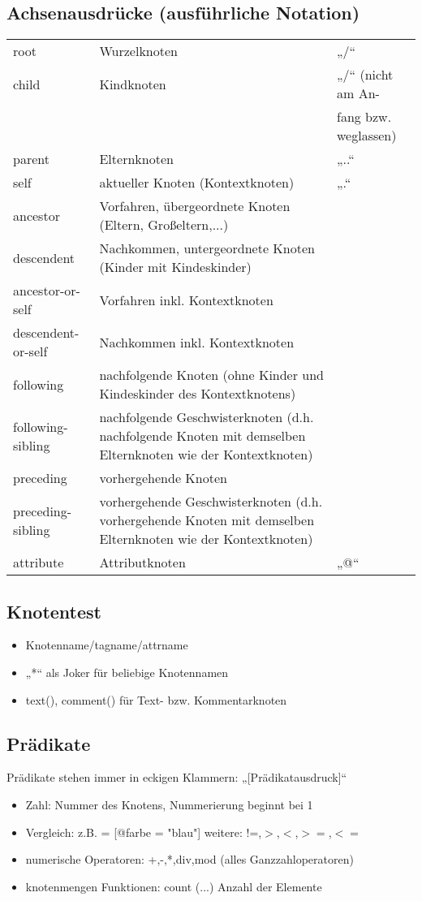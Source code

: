 \subsection{Achsenausdrücke (ausführliche Notation)}
\begin{tabularx}{\textwidth}{lXl}
root & Wurzelknoten & „/“\\
child & Kindknoten & „/“ {\tiny (nicht am An-}\\
 & & {\tiny fang bzw. weglassen)}\\
parent & Elternknoten & „..“\\
self & aktueller Knoten (Kontextknoten) & „.“\\
ancestor & Vorfahren, übergeordnete Knoten (Eltern, Großeltern,...)& \\
descendent & Nachkommen, untergeordnete Knoten (Kinder mit Kindeskinder) & \\
ancestor-or-self & Vorfahren inkl. Kontextknoten & \\
descendent-or-self & Nachkommen inkl. Kontextknoten & \\
following & nachfolgende Knoten (ohne Kinder und Kindeskinder des Kontextknotens) & \\
following-sibling & nachfolgende Geschwisterknoten (d.h. nachfolgende Knoten mit demselben Elternknoten wie der Kontextknoten) & \\
preceding & vorhergehende Knoten & \\
preceding-sibling & vorhergehende Geschwisterknoten (d.h. vorhergehende Knoten mit demselben Elternknoten wie der Kontextknoten) & \\
attribute & Attributknoten & „@“
\end{tabularx}

\subsection{Knotentest}
\begin{itemize}
\item Knotenname/tagname/attrname
\item „*“ als Joker für beliebige Knotennamen
\item text(), comment() für Text- bzw. Kommentarknoten 
\end{itemize}

\subsection{Prädikate}
Prädikate stehen immer in eckigen Klammern: „[Prädikatausdruck]“\\
\begin{itemize}
\item Zahl: Nummer des Knotens, Nummerierung beginnt bei 1
\item Vergleich: z.B. = [@farbe = "blau"] weitere: !=,$>$,$<$,$>=$,$<=$
\item numerische Operatoren: +,-,*,div,mod (alles Ganzzahloperatoren)
\item knotenmengen Funktionen: count (...) Anzahl der Elemente
\end{itemize}


